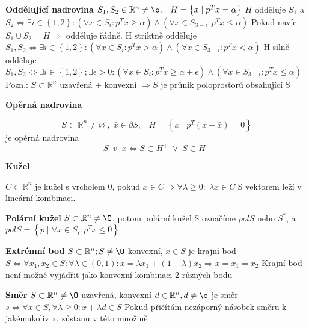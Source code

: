 \textbf{Oddělující nadrovina}
$S_{1},S_{2}\in \mathbb{R}^{n}\neq \o ,\; \; \; H=\left \{ x\; |\; p^{T}x=\alpha  \right \}$
\newline $H$ odděluje $S_{1}$ a $S_{2}\Leftrightarrow \exists i\in \left \{ 1,2 \right \}:(\forall x\in S_{i}:p^{T}x\geq \alpha )\wedge (\forall x\in S_{3-i}:p^{T}x\leq \alpha ) $  
\newline Pokud navíc $S_{1} \cup S_{2} = H\Rightarrow $ odděluje řádně.
\newline H striktně odděluje $S_{1}, S_{2}\Leftrightarrow \exists i\in \left \{ 1,2 \right \}:(\forall x\in S_{i}:p^{T}x>  \alpha )\wedge (\forall x\in S_{3-i}:p^{T}x<  \alpha )$
\newline H silně odděluje $S_{1}, S_{2}\Leftrightarrow \exists i\in \left \{ 1,2 \right \}; \exists \epsilon > 0 :(\forall x\in S_{i}:p^{T}x\geq   \alpha +\epsilon )\wedge (\forall x\in S_{3-i}:p^{T}x\leq   \alpha )$
Pozn.: $S\subset \mathbb{R}^{n} $ uzavřená + konvexní $ \Rightarrow S$ je průnik poloprostorů obsahující S



\textbf{Opěrná nadrovina}

$$ S\subset \mathbb{R}^{n}\neq \varnothing \; ,\; \bar{x} \in \partial S,\; \; \; H=\left \{ x\; |\; p^{T}(x-\bar{x})=0 \right \} $$ 
je opěrná nadrovina
$$ S\; \; v\; \; \bar{x} \Leftrightarrow S\subset H^{+}\; \vee \; S\subset H^{-}$$


\textbf{Kužel}

$C\subset \mathbb{R}^{n}$ je kužel s vrcholem 0, pokud $x \in C \Rightarrow \forall \lambda \geq 0: \; \lambda x \in C$ 
\newline S vektorem leží v lineární kombinaci.

\textbf{Polární kužel}
$ S\subset \mathbb{R}^{n}\neq \O $, potom polární kužel S označíme $polS$ nebo $S^{*}$, a $polS=\left \{  p\; |\; \forall x\in S_{i}:p^{T}x\leq  0 \right \}$




\textbf{Extrémní bod}
$ S\subset \mathbb{R}^{n}; S\neq \O $ konvexní, $x\in S$ je krajní bod $S\Leftrightarrow \forall x_{1},x_{2}\in S:\forall \lambda \in (0,1): x=\lambda x_{1}+(1-\lambda )x_{2}\Rightarrow x=x_{1}=x_{2}$
\newline Krajní bod není možné vyjádřit jako konvexní kombinaci 2 různých bodu 

\textbf{Směr}
$ S\subset \mathbb{R}^{n}\neq \O $ uzavřená, konvexní 
\newline $d\in \mathbb{R}^{n}, d\neq \o $ je směr $s\Leftrightarrow \forall x\in S, \forall \lambda \geq 0: x+\lambda d\in S$
\newline Pokud přičítám nezáporný násobek směru k jakémukoliv x, zůstanu v této množině


